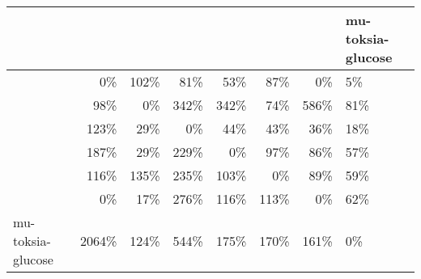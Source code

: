 \begin{tabular}{lrrrrrr}
\toprule
{} &  &  &  &  &  &  & mu-toksia-glucose \\
\midrule
{}            &     0\% &   102\% &    81\% &    53\% &    87\% &     0\% &                5\% \\
            &    98\% &     0\% &   342\% &   342\% &    74\% &   586\% &               81\% \\
            &   123\% &    29\% &     0\% &    44\% &    43\% &    36\% &               18\% \\
            &   187\% &    29\% &   229\% &     0\% &    97\% &    86\% &               57\% \\
            &   116\% &   135\% &   235\% &   103\% &     0\% &    89\% &               59\% \\
            &     0\% &    17\% &   276\% &   116\% &   113\% &     0\% &               62\% \\
mu-toksia-glucose &  2064\% &   124\% &   544\% &   175\% &   170\% &   161\% &                0\% \\
\bottomrule
\end{tabular}
